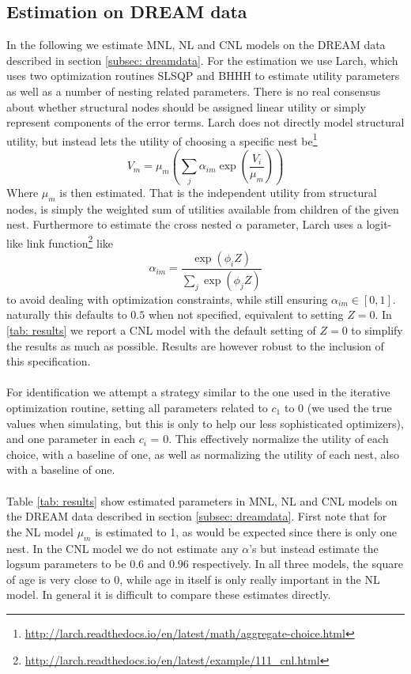 \subsection{Estimation on DREAM data}
In the following we estimate MNL, NL and CNL models on the DREAM data described in section \ref{subsec: dreamdata}.
For the estimation we use Larch, which uses two optimization routines SLSQP and BHHH to estimate utility parameters as well as a number of nesting related parameters. There is no real consensus about whether structural nodes should be assigned linear utility or simply represent components of the error terms. Larch does not directly model structural utility, but instead lets the utility of choosing a specific nest be\footnote{\url{http://larch.readthedocs.io/en/latest/math/aggregate-choice.html}}
\begin{equation}
  V_{m} = \mu_{m} \left( \sum_{j} \alpha_{im} \exp \left( \frac{V_i}{\mu_m}
  \right) \right)
\end{equation}
Where $\mu_m$ is then estimated. That is the independent utility from structural nodes, is simply the weighted sum of utilities available from children of the given nest. Furthermore to estimate the cross nested $\alpha$ parameter, Larch uses a logit-like link function\footnote{\url{http://larch.readthedocs.io/en/latest/example/111_cnl.html}} like
\begin{equation}
  \alpha_{im} = \frac{\exp(\phi_{i} Z )}{\sum_j \exp(\phi_j Z)}
\end{equation}
to avoid dealing with optimization constraints, while still ensuring $\alpha_{im} \in [0,1]$. naturally this defaults to $0.5$ when not specified, equivalent to setting $Z = 0$. In \ref{tab: results} we report a CNL model with the default setting of $Z = 0$ to simplify the results as much as possible. Results are however robust to the inclusion of this specification.
\\ \\
For identification we attempt a strategy similar to the one used in the iterative optimization routine, setting all parameters related to $c_1$ to $0$ (we used the true values when simulating, but this is only to help our less sophisticated optimizers), and one parameter in each $c_i$ = $0$. This effectively normalize the utility of each choice, with a baseline of one, as well as normalizing the utility of each nest, also with a baseline of one.
\\ \\
Table \ref{tab: results} show estimated parameters in MNL, NL and CNL models on the DREAM data described in section \ref{subsec: dreamdata}. First note that for the NL model $\mu_m$ is estimated to 1, as would be expected since there is only one nest. In the CNL model we do not estimate any $\alpha$'s but instead estimate the logsum parameters to be $0.6$ and $0.96$ respectively. In all three models, the square of age is very close to $0$, while age in itself is only really important in the NL model. In general it is difficult to compare these estimates directly.
